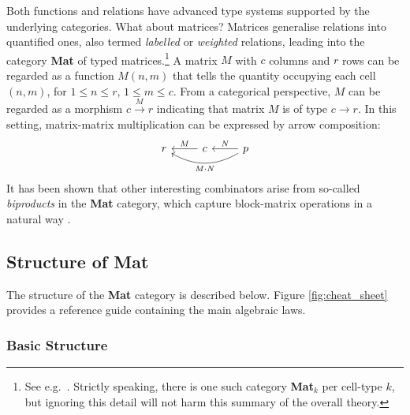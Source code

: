 \documentclass[sigplan,screen]{acmart}
\begin{document}
Both functions and relations have advanced type systems supported by the underlying categories. What about matrices? Matrices generalise relations into quantified ones, also termed \emph{labelled} or \emph{weighted} relations, leading into the category \textbf{Mat} of typed matrices.\footnote{See e.g.\ \cite{MO13c}. Strictly speaking, there is one such category \textbf{Mat}$_k$ per cell-type $k$, but ignoring this detail will not harm this summary of the overall theory.} A matrix $M$ with $c$ columns and $r$ rows can be regarded as a function $M(n, m)$ that tells the quantity occupying each cell $(n,m)$, for $1 \leq n \leq r$,  $1 \leq m \leq c$. From a categorical perspective, $M$ can be regarded as a morphism $c \xrightarrow{M} r$ indicating that matrix $M$ is of type $c \longrightarrow r$. In this setting, matrix-matrix multiplication can be expressed by arrow composition:
\begin{equation}\label{mm-cat-comp}
\begin{tikzcd}
r & c \arrow[l, "M"'] & p \arrow[l, "N"'] \arrow[ll, "M \cdot N", bend left]
\end{tikzcd}
\end{equation}
\noindent It has been shown that other interesting combinators arise from so-called \emph{biproducts} in the \textbf{Mat} category, which capture block-matrix operations in a natural way \cite{MO13c}. 

\subsection{Structure of \textbf{Mat}}\label{sec-struct-mat}
The structure of the \textbf{Mat} category is described below. \newline Figure \ref{fig:cheat_sheet} provides a reference guide containing the main algebraic laws.

\subsubsection{Basic Structure}
\end{document}
